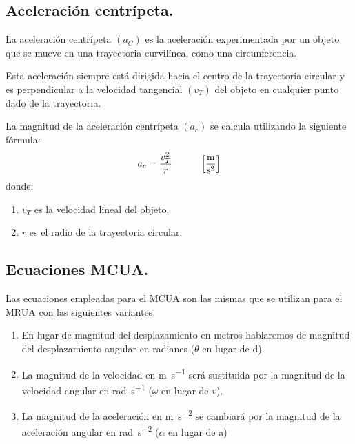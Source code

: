 \documentclass[14pt]{extarticle}
\begin{document}
\subsection{Aceleración centrípeta.}

La aceleración centrípeta $(a_{C})$ es la aceleración experimentada por un objeto que se mueve en una trayectoria curvilínea, como una circunferencia.

Esta aceleración siempre está dirigida hacia el centro de la trayectoria circular  y es perpendicular a la velocidad tangencial $(v_{T})$ del objeto en cualquier punto dado de la trayectoria.
\begin{figure}[H]
    \centering
{}
\end{figure}

La magnitud de la aceleración centrípeta $(a_{c})$ se calcula utilizando la siguiente fórmula:
\begin{align*}
a_{c} = \dfrac{v_{T}^{2}}{r} \hspace{1cm} \left[ \unit[per-mode=fraction]{\meter\per\square\second} \right]
\end{align*}
donde:
\begin{enumerate}[label=\alph*)]
\item $v_{T}$ es la velocidad lineal del objeto.
\item $r$ es el radio de la trayectoria circular.
\end{enumerate}

\subsection{Ecuaciones MCUA.}

Las ecuaciones empleadas para el MCUA son las mismas que se utilizan para el MRUA con las siguientes variantes.

\begin{enumerate}[label=\roman*)]
\item En lugar de magnitud del desplazamiento en metros hablaremos de magnitud del desplazamiento angular en radianes ($\theta$ en lugar de d).
\item La magnitud de la velocidad en \unit{\meter\per\second} será sustituida por la magnitud de la velocidad angular en \unit{\radian\per\second} ($\omega$ en lugar de $v$).
\item La magnitud de la aceleración en \unit{\meter\per\square\second} se cambiará por la magnitud de la aceleración angular en \unit{\radian\per\square\second} ($\alpha$ en lugar de a)
\end{enumerate}
\end{document}
